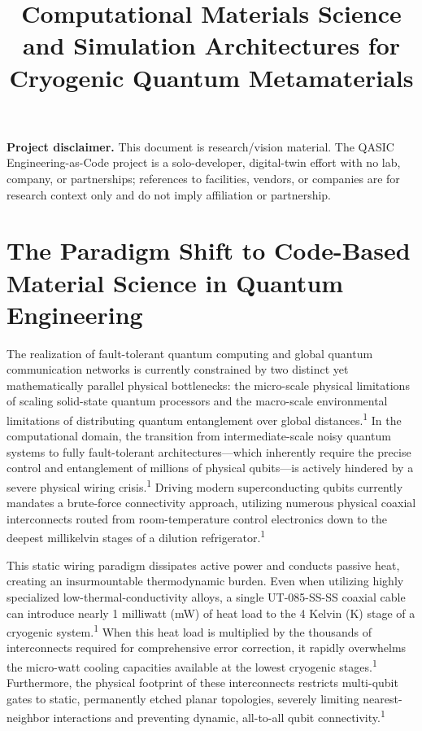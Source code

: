\documentclass[11pt, a4paper]{article}
\begin{document}
\title{\textbf{Computational Materials Science and Simulation Architectures for Cryogenic Quantum Metamaterials}}
\date{}
\maketitle

\noindent\textbf{Project disclaimer.} This document is research/vision material. The QASIC Engineering-as-Code project is a solo-developer, digital-twin effort with no lab, company, or partnerships; references to facilities, vendors, or companies are for research context only and do not imply affiliation or partnership.

\section{The Paradigm Shift to Code-Based Material Science in Quantum Engineering}

The realization of fault-tolerant quantum computing and global quantum communication networks is currently constrained by two distinct yet mathematically parallel physical bottlenecks: the micro-scale physical limitations of scaling solid-state quantum processors and the macro-scale environmental limitations of distributing quantum entanglement over global distances.\textsuperscript{1} In the computational domain, the transition from intermediate-scale noisy quantum systems to fully fault-tolerant architectures---which inherently require the precise control and entanglement of millions of physical qubits---is actively hindered by a severe physical wiring crisis.\textsuperscript{1} Driving modern superconducting qubits currently mandates a brute-force connectivity approach, utilizing numerous physical coaxial interconnects routed from room-temperature control electronics down to the deepest millikelvin stages of a dilution refrigerator.\textsuperscript{1}

This static wiring paradigm dissipates active power and conducts passive heat, creating an insurmountable thermodynamic burden. Even when utilizing highly specialized low-thermal-conductivity alloys, a single UT-085-SS-SS coaxial cable can introduce nearly 1 milliwatt (mW) of heat load to the 4 Kelvin (K) stage of a cryogenic system.\textsuperscript{1} When this heat load is multiplied by the thousands of interconnects required for comprehensive error correction, it rapidly overwhelms the micro-watt cooling capacities available at the lowest cryogenic stages.\textsuperscript{1} Furthermore, the physical footprint of these interconnects restricts multi-qubit gates to static, permanently etched planar topologies, severely limiting nearest-neighbor interactions and preventing dynamic, all-to-all qubit connectivity.\textsuperscript{1}
\end{document}
